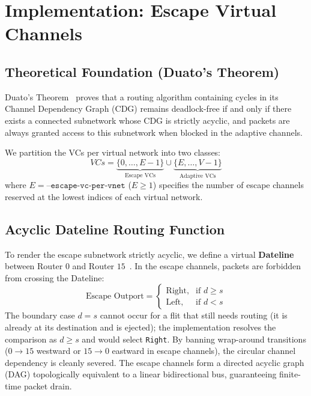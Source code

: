 \documentclass[10pt,journal,compsoc]{IEEEtran}
\begin{document}
\section{Implementation: Escape Virtual Channels}

\subsection{Theoretical Foundation (Duato's Theorem)}
Duato's Theorem~\cite{duato1993new} proves that a routing algorithm containing cycles in its Channel Dependency Graph (CDG) remains deadlock-free if and only if there exists a connected subnetwork whose CDG is strictly acyclic, and packets are always granted access to this subnetwork when blocked in the adaptive channels.

We partition the VCs per virtual network into two classes:
\begin{equation}
VCs = \underbrace{\{0, \dots, E-1\}}_{\text{Escape VCs}} \cup \underbrace{\{E, \dots, V-1\}}_{\text{Adaptive VCs}}
\end{equation}
where $E = \texttt{--escape-vc-per-vnet}$ ($E \ge 1$) specifies the number of escape channels reserved at the lowest indices of each virtual network.

\subsection{Acyclic Dateline Routing Function}
To render the escape subnetwork strictly acyclic, we define a virtual \textbf{Dateline} between Router $0$ and Router $15$~\cite{dally1987deadlock}. In the escape channels, packets are forbidden from crossing the Dateline:
\begin{equation}
\text{Escape Outport} = \begin{cases}
\text{Right}, & \text{if } d \ge s \\
\text{Left}, & \text{if } d < s
\end{cases}
\end{equation}
The boundary case $d=s$ cannot occur for a flit that still needs routing (it is already at its destination and is ejected); the implementation resolves the comparison as $d \ge s$ and would select \texttt{Right}.
By banning wrap-around transitions ($0 \to 15$ westward or $15 \to 0$ eastward in escape channels), the circular channel dependency is cleanly severed. The escape channels form a directed acyclic graph (DAG) topologically equivalent to a linear bidirectional bus, guaranteeing finite-time packet drain.
\end{document}
